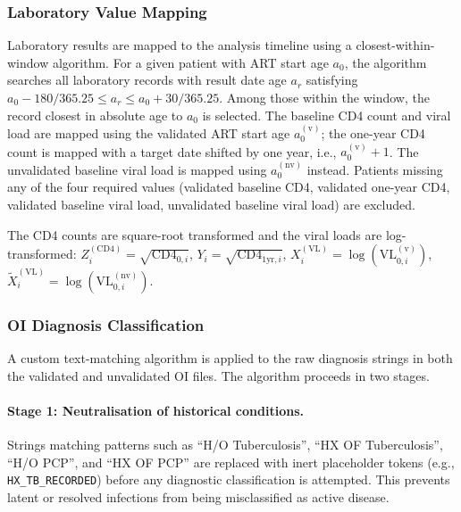 \subsubsection{Laboratory Value Mapping}

Laboratory results are mapped to the analysis timeline using a closest-within-window algorithm. For a given patient with ART start age $a_0$, the algorithm searches all laboratory records with result date age $a_r$ satisfying $a_0 - 180/365.25 \leq a_r \leq a_0 + 30/365.25$. Among those within the window, the record closest in absolute age to $a_0$ is selected. The baseline CD4 count and viral load are mapped using the validated ART start age $a_0^{(\mathrm{v})}$; the one-year CD4 count is mapped with a target date shifted by one year, i.e., $a_0^{(\mathrm{v})} + 1$. The unvalidated baseline viral load is mapped using $a_0^{(\mathrm{nv})}$ instead. Patients missing any of the four required values (validated baseline CD4, validated one-year CD4, validated baseline viral load, unvalidated baseline viral load) are excluded.

The CD4 counts are square-root transformed and the viral loads are log-transformed: $Z_i^{(\mathrm{CD4})} = \sqrt{\mathrm{CD4}_{0,i}}$, $Y_i = \sqrt{\mathrm{CD4}_{1\mathrm{yr},i}}$, $X_i^{(\mathrm{VL})} = \log(\mathrm{VL}_{0,i}^{(\mathrm{v})})$, $\tilde{X}_i^{(\mathrm{VL})} = \log(\mathrm{VL}_{0,i}^{(\mathrm{nv})})$.

\subsubsection{OI Diagnosis Classification}
\label{app:vccc_dx_classify}

A custom text-matching algorithm is applied to the raw diagnosis strings in both the validated and unvalidated OI files. The algorithm proceeds in two stages.

\paragraph{Stage 1: Neutralisation of historical conditions.}
Strings matching patterns such as ``H/O Tuberculosis'', ``HX OF Tuberculosis'', ``H/O PCP'', and ``HX OF PCP'' are replaced with inert placeholder tokens (e.g., \texttt{HX\_TB\_RECORDED}) before any diagnostic classification is attempted. This prevents latent or resolved infections from being misclassified as active disease.

